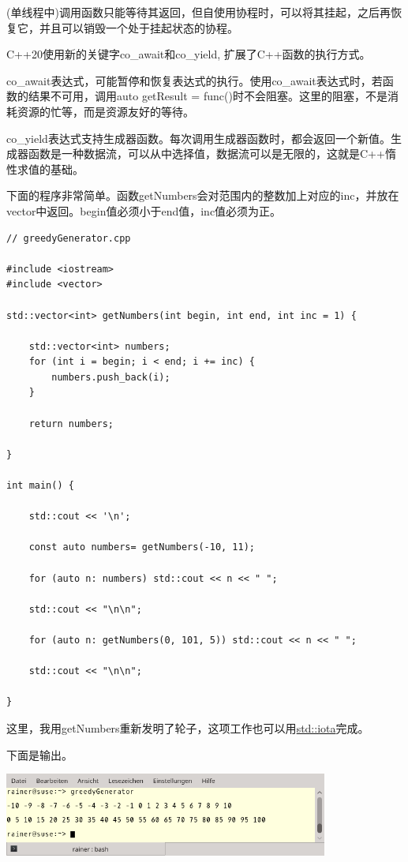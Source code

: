 (单线程中)调用函数只能等待其返回，但自使用协程时，可以将其挂起，之后再恢复它，并且可以销毁一个处于挂起状态的协程。

C++20使用新的关键字co\_await和co\_yield, 扩展了C++函数的执行方式。

co\_await表达式，可能暂停和恢复表达式的执行。使用co\_await表达式时，若函数的结果不可用，调用auto getResult = func()时不会阻塞。这里的阻塞，不是消耗资源的忙等，而是资源友好的等待。

co\_yield表达式支持生成器函数。每次调用生成器函数时，都会返回一个新值。生成器函数是一种数据流，可以从中选择值，数据流可以是无限的，这就是C++惰性求值的基础。


下面的程序非常简单。函数getNumbers会对范围内的整数加上对应的inc，并放在vector中返回。begin值必须小于end值，inc值必须为正。

\begin{lstlisting}[style=styleCXX]
// greedyGenerator.cpp

#include <iostream>
#include <vector>

std::vector<int> getNumbers(int begin, int end, int inc = 1) {

	std::vector<int> numbers;
	for (int i = begin; i < end; i += inc) {
		numbers.push_back(i);
	}
	
	return numbers;

}

int main() {

	std::cout << '\n';
	
	const auto numbers= getNumbers(-10, 11);
	
	for (auto n: numbers) std::cout << n << " ";
	
	std::cout << "\n\n";
	
	for (auto n: getNumbers(0, 101, 5)) std::cout << n << " ";
	
	std::cout << "\n\n";

}
\end{lstlisting}

这里，我用getNumbers重新发明了轮子，这项工作也可以用\href{http://en.cppreference.com/w/cpp/algorithm/iota}{std::iota}完成。

下面是输出。

\begin{center}
\includegraphics[width=0.8\textwidth]{content/3/chapter6/images/4.png}\\
\end{center}

